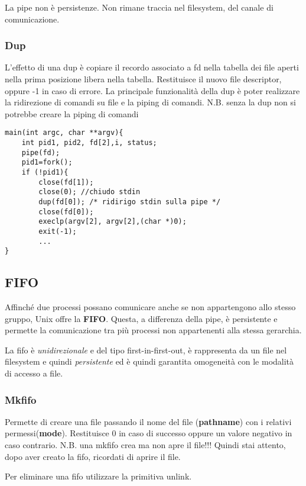 \documentclass{article}
\begin{document}
\noindent La pipe non è persistenze. Non rimane traccia nel filesystem, 
del canale di comunicazione.

 \subsubsection{Dup}
 \noindent {} 
 \medskip 

\noindent L'effetto di una dup è copiare il recordo associato a fd nella tabella dei file aperti 
nella prima posizione libera nella tabella.
Restituisce il nuovo file descriptor, oppure -1 in caso di errore.
La principale funzionalità della dup è poter realizzare la ridirezione di comandi su file e la piping di comandi.
N.B. senza la dup non si potrebbe creare la piping di comandi 

\begin{lstlisting}[style=CStyle]
main(int argc, char **argv){ 
    int pid1, pid2, fd[2],i, status;
    pipe(fd);
    pid1=fork();
    if (!pid1){
        close(fd[1]);
        close(0); //chiudo stdin
        dup(fd[0]); /* ridirigo stdin sulla pipe */
        close(fd[0]);
        execlp(argv[2], argv[2],(char *)0);
        exit(-1);
        ...
}
\end{lstlisting}

\subsection{FIFO}
Affinché due processi possano comunicare anche se non appartengono allo stesso gruppo,
Unix offre la \textbf{FIFO}. Questa, a differenza della pipe, è persistente e permette la 
comunicazione tra più processi non appartenenti alla stessa gerarchia.

\noindent La fifo è \textit{unidirezionale} e del tipo first-in-first-out, è rappresenta da un file 
nel filesystem e quindi \textit{persistente} ed è quindi garantita omogeneità con le modalità di accesso a file.

\subsubsection{Mkfifo}

\noindent {} 
\medskip 

\noindent Permette di creare una file passando il nome del file (\textbf{pathname}) con i relativi permessi(\textbf{mode}).
Restituisce 0 in caso di successo oppure un valore negativo in caso contrario.
N.B. una mkfifo crea ma non apre il file!!! Quindi stai attento, dopo aver creato la fifo, ricordati di aprire il file.

\noindent Per eliminare una fifo utilizzare la primitiva unlink.
\end{document}
